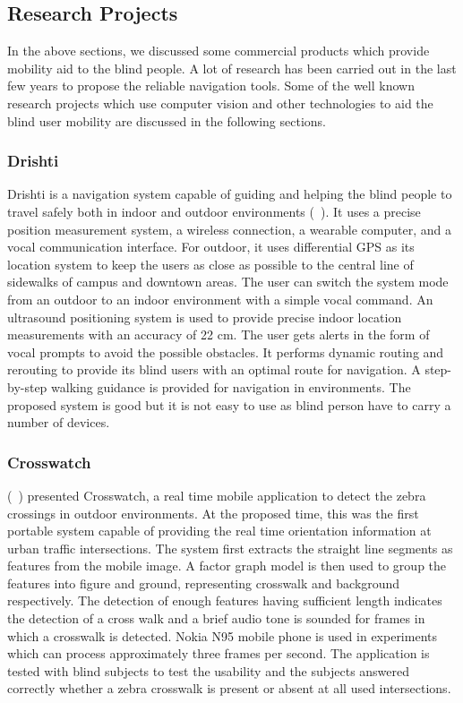 \subsection{Research Projects}
\label{sec:research}

In the above sections, we discussed some 
commercial products which provide mobility aid 
to the blind people. A lot of research 
has been carried out in the last few years 
to propose the reliable navigation tools. 
Some of the well known research projects 
which use computer vision and other 
technologies to aid the blind 
user mobility are discussed in the 
following sections. 

\subsubsection{Drishti}

Drishti is a navigation system capable 
of guiding and helping the blind people 
to travel safely both in indoor and outdoor environments (~\cite{ran04}). 
It uses a precise position measurement system, a wireless 
connection, a wearable computer, and a vocal communication interface. 
For outdoor, it uses differential GPS as its location system
to keep the users as close as possible to the 
central line of sidewalks of campus and downtown areas. 
The user can switch the system mode from an 
outdoor to an indoor environment with a simple vocal command. 
An ultrasound positioning system is used to 
provide precise indoor location measurements 
with an accuracy of 22 cm. The user gets 
alerts in the form of vocal prompts to avoid 
the possible obstacles. 
It performs dynamic routing and rerouting to provide 
its blind users with an optimal route for navigation. 
A step-by-step walking guidance is provided for 
navigation in environments. The proposed system is 
good but it is not easy to use as blind person 
have to carry a number of devices.



\subsubsection{Crosswatch}
(~\cite{james08}) presented Crosswatch,
a real time mobile application 
to detect the zebra crossings in outdoor environments. 
At the proposed time, this was the first 
portable system capable of providing 
the real time orientation information 
at urban traffic intersections. 
The system first extracts the straight line segments 
as features from the mobile image. A factor graph model 
is then used to group the features into figure and ground, 
representing crosswalk and background respectively. 
The detection of enough features having sufficient length 
indicates the detection of a cross walk 
and a brief audio tone is sounded for frames 
in which a crosswalk is detected. 
Nokia N95 mobile phone is used in experiments 
which can process approximately three frames per second.
The application is tested with blind subjects to test the usability 
and the subjects answered correctly whether a zebra crosswalk 
is present or absent at all used intersections. 



